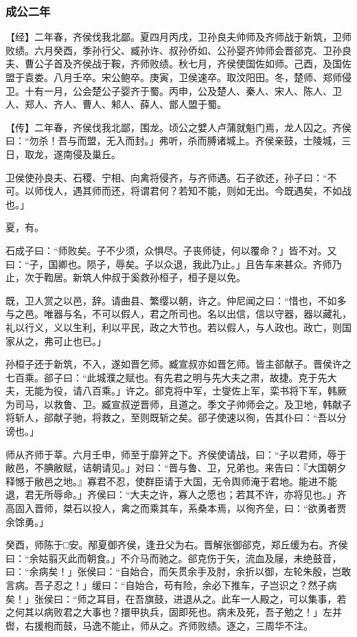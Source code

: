 \documentclass[]{article}
\begin{document}
\hypertarget{header-n1519}{%
\subsubsection{成公二年 }\label{header-n1519}}

【经】二年春，齐侯伐我北鄙。夏四月丙戌，卫孙良夫帅师及齐师战于新筑，卫师败绩。六月癸酉，季孙行父、臧孙许、叔孙侨如、公孙婴齐帅师会晋郤克、卫孙良夫、曹公子首及齐侯战于鞍，齐师败绩。秋七月，齐侯使国佐如师。己酉，及国佐盟于袁娄。八月壬卒。宋公鲍卒。庚寅，卫侯速卒。取汶阳田。冬，楚师、郑师侵卫。十有一月，公会楚公子婴齐于蜀。丙申，公及楚人、秦人、宋人、陈人、卫人、郑人、齐人、曹人、邾人、薛人、鄫人盟于蜀。

【传】二年春，齐侯伐我北鄙，围龙。顷公之嬖人卢蒲就魁门焉，龙人囚之。齐侯曰：``勿杀！吾与而盟，无入而封。」弗听，杀而膊诸城上。齐侯亲鼓，士陵城，三日，取龙，遂南侵及巢丘。

卫侯使孙良夫、石稷、宁相、向禽将侵齐，与齐师遇。石子欲还，孙子曰：``不可。以师伐人，遇其师而还，将谓君何？若知不能，则如无出。今既遇矣，不如战也。」

夏，有。

石成子曰：``师败矣。子不少须，众惧尽。子丧师徒，何以覆命？」皆不对。又曰：``子，国卿也。陨子，辱矣。子以众退，我此乃止。」且告车来甚众。齐师乃止，次于鞫居。新筑人仲叔于奚救孙桓子，桓子是以免。

既，卫人赏之以邑，辞。请曲县、繁缨以朝，许之。仲尼闻之曰：``惜也，不如多与之邑。唯器与名，不可以假人，君之所司也。名以出信，信以守器，器以藏礼，礼以行义，义以生利，利以平民，政之大节也。若以假人，与人政也。政亡，则国家从之，弗可止也已。」

孙桓子还于新筑，不入，遂如晋乞师。臧宣叔亦如晋乞师。皆主郤献子。晋侯许之七百乘。郤子曰：``此城濮之赋也。有先君之明与先大夫之肃，故捷。克于先大夫，无能为役，请八百乘。」许之。郤克将中军，士燮佐上军，栾书将下军，韩厥为司马，以救鲁、卫。臧宣叔逆晋师，且道之。季文子帅师会之。及卫地，韩献子将斩人，郤献子驰，将救之，至则既斩之矣。郤子使速以徇，告其仆曰：``吾以分谤也。」

师从齐师于莘。六月壬申，师至于靡笄之下。齐侯使请战，曰：``子以君师，辱于敝邑，不腆敝赋，诘朝请见。」对曰：``晋与鲁、卫，兄弟也。来告曰：『大国朝夕释憾于敝邑之地。』寡君不忍，使群臣请于大国，无令舆师淹于君地。能进不能退，君无所辱命。」齐侯曰：``大夫之许，寡人之愿也；若其不许，亦将见也。」齐高固入晋师，桀石以投人，禽之而乘其车，系桑本焉，以徇齐垒，曰：``欲勇者贾余馀勇。」

癸酉，师陈于□安。邴夏御齐侯，逢丑父为右。晋解张御郤克，郑丘缓为右。齐侯曰：``余姑翦灭此而朝食。」不介马而驰之。郤克伤于矢，流血及屦，未绝鼓音，曰：``余病矣！」张侯曰：``自始合，而矢贯余手及肘，余折以御，左轮朱殷，岂敢言病。吾子忍之！」缓曰：``自始合，苟有险，余必下推车，子岂识之？然子病矣！」张侯曰：``师之耳目，在吾旗鼓，进退从之。此车一人殿之，可以集事，若之何其以病败君之大事也？擐甲执兵，固即死也。病未及死，吾子勉之！」左并辔，右援枹而鼓，马逸不能止，师从之。齐师败绩。逐之，三周华不注。
\end{document}
